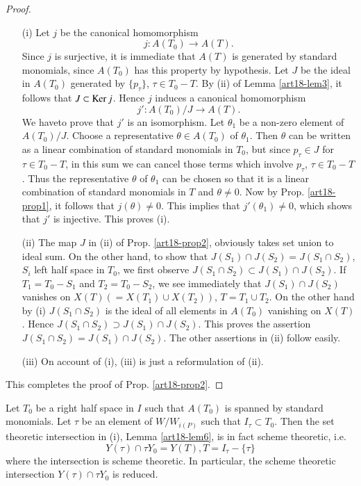 \begin{proof}
\begin{itemize}
\item[\rm (i)] Let $j$ be the canonical homomorphism
$$
j : A (T_0) \to A (T).
$$
Since $j$ is surjective, it is immediate that $A(T)$ is generated by standard monomials, since $A(T_0)$ has this property by hypothesis. Let $J$ be the ideal in $A(T_0)$ generated by $\{p_\tau\}$, $\tau \in T_0 - T$. By (ii) of Lemma \ref{art18-lem3}, it follows that $J\subset \operatorname{Ker} j$. Hence $j$ induces a canonical homomorphism
$$
j' : A (T_0) / J \to A (T).
$$
We have\pageoriginale to prove that $j'$ is an isomorphism. Let $\theta_1$ be a non-zero element of $A(T_0)/J$. Choose a representative $\theta \in A (T_0)$ of $\theta_1$. Then $\theta$ can be written as a linear combination of standard monomials in $T_0$, but since $p_\tau \in J$ for $\tau \in T_0 -T$, in this sum we can cancel those terms which involve $p_\tau$, $\tau \in T_0 - T$. Thus the representative $\theta$ of $\theta_1$ can be chosen so that it is a linear combination of standard monomials in $T$ and $\theta \neq 0$. Now by Prop. \ref{art18-prop1}, it follows that $j(\theta) \neq 0$. This implies that $j'(\theta_1) \neq 0$, which shows that $j'$ is injective. This proves (i).

\item[\rm (ii)] The map $J$ in (ii) of Prop. \ref{art18-prop2}, obviously takes set union to ideal sum. On the other hand, to show that $J(S_1) \cap J(S_2) = J(S_1 \cap S_2)$, $S_i$ left half space in $T_0$, we first observe $J(S_1 \cap S_2) \subset J (S_1) \cap J(S_2)$. If $T_1 = T_0 - S_1$ and $T_2 = T_0 - S_2$, we see immediately that $J(S_1) \cap J(S_2)$ vanishes on $X(T) (= X (T_1) \cup X(T_2))$, $T = T_1 \cup T_2$. On the other hand by (i) $J(S_1 \cap S_2)$ is the ideal of all elements in $A(T_0)$ vanishing on $X(T)$. Hence $J(S_1 \cap S_2) \supset J(S_1) \cap J (S_2)$. This proves the assertion $J(S_1 \cap S_2) = J(S_1) \cap J (S_2)$. The other assertions in (ii) follow easily.

\item[\rm (iii)] On account of (i), (iii) is just a reformulation of (ii).
\end{itemize}

This completes the proof of Prop. \ref{art18-prop2}.
\end{proof}

\begin{coro}\label{art18-coro1}
Let $T_0$ be a right half space in $I$ such that $A (T_0)$ is spanned by standard monomials. Let $\tau$ be an element of $W/W_{i(P)}$ such that $I_\tau \subset T_0$. Then the set theoretic intersection in (i), Lemma \ref{art18-lem6}, is in fact scheme theoretic, i.e.
$$
Y(\tau) \cap \tau Y_0 = Y(T), T = I_\tau - \{\tau\}
$$
where the intersection is scheme theoretic. In particular, the scheme theoretic intersection $Y(\tau) \cap \tau Y_0$ is reduced.
\end{coro}

